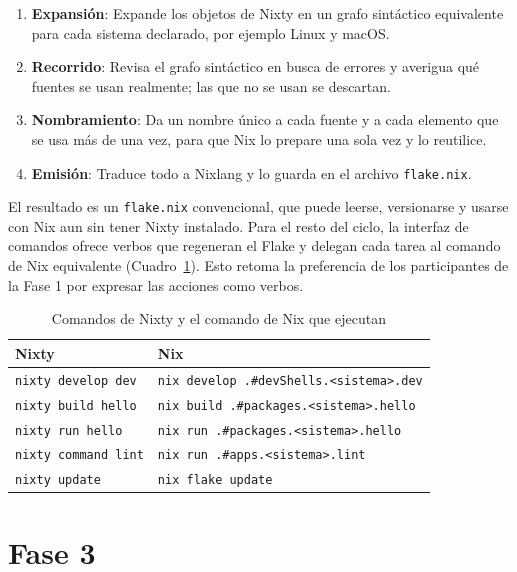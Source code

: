 \begin{enumerate}
\item \textbf{Expansión}: Expande los objetos de Nixty en un grafo sintáctico equivalente para cada sistema declarado, por ejemplo Linux y macOS.
\item \textbf{Recorrido}: Revisa el grafo sintáctico en busca de errores y averigua qué fuentes se usan realmente; las que no se usan se descartan.
\item \textbf{Nombramiento}: Da un nombre único a cada fuente y a cada elemento que se usa más de una vez, para que Nix lo prepare una sola vez y lo reutilice.
\item \textbf{Emisión}: Traduce todo a Nixlang y lo guarda en el archivo \texttt{flake.nix}.
\end{enumerate}

El resultado es un \texttt{flake.nix} convencional, que puede leerse, versionarse y usarse con Nix aun sin tener Nixty instalado. Para el resto del ciclo, la interfaz de comandos ofrece verbos que regeneran el Flake y delegan cada tarea al comando de Nix equivalente (Cuadro~\ref{cuadro-cli}). Esto retoma la preferencia de los participantes de la Fase 1 por expresar las acciones como verbos.

\begin{table}[htbp]
\centering
\setlength{\tabcolsep}{4pt}
\begin{tabular}{|l|l|}
\hline
\textbf{Nixty} & \textbf{Nix} \\
\hline
\texttt{nixty develop dev} & \texttt{nix develop .\allowbreak{}\#devShells.\allowbreak{}<sistema>.\allowbreak{}dev} \\
\hline
\texttt{nixty build hello} & \texttt{nix build .\allowbreak{}\#packages.\allowbreak{}<sistema>.\allowbreak{}hello} \\
\hline
\texttt{nixty run hello} & \texttt{nix run .\allowbreak{}\#packages.\allowbreak{}<sistema>.\allowbreak{}hello} \\
\hline
\texttt{nixty command lint} & \texttt{nix run .\allowbreak{}\#apps.\allowbreak{}<sistema>.\allowbreak{}lint} \\
\hline
\texttt{nixty update} & \texttt{nix flake update} \\
\hline
\end{tabular}
\caption{Comandos de Nixty y el comando de Nix que ejecutan}
\label{cuadro-cli}
\end{table}

\section{Fase 3}


